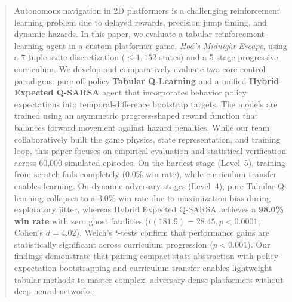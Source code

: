 \begin{abstract}
Autonomous navigation in 2D platformers is a challenging reinforcement learning problem due to delayed rewards, precision jump timing, and dynamic hazards. In this paper, we evaluate a tabular reinforcement learning agent in a custom platformer game, \textit{Ho{\'a}'s Midnight Escape}, using a 7-tuple state discretization ($\le 1{,}152$ states) and a 5-stage progressive curriculum. We develop and comparatively evaluate two core control paradigms: pure off-policy \textbf{Tabular Q-Learning} and a unified \textbf{Hybrid Expected Q-SARSA} agent that incorporates behavior policy expectations into temporal-difference bootstrap targets. The models are trained using an asymmetric progress-shaped reward function that balances forward movement against hazard penalties. While our team collaboratively built the game physics, state representation, and training loop, this paper focuses on empirical evaluation and statistical verification across 60,000 simulated episodes. On the hardest stage (Level~5), training from scratch fails completely (0.0\% win rate), while curriculum transfer enables learning. On dynamic adversary stages (Level~4), pure Tabular Q-learning collapses to a 3.0\% win rate due to maximization bias during exploratory jitter, whereas Hybrid Expected Q-SARSA achieves a \textbf{98.0\% win rate} with zero ghost fatalities ($t(181.9) = 28.45, p < 0.0001$, Cohen's $d = 4.02$). Welch's $t$-tests confirm that performance gains are statistically significant across curriculum progression ($p < 0.001$). Our findings demonstrate that pairing compact state abstraction with policy-expectation bootstrapping and curriculum transfer enables lightweight tabular methods to master complex, adversary-dense platformers without deep neural networks.

\end{abstract}
